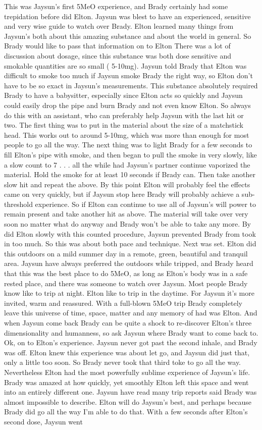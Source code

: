 \documentclass[12pt]{book}
\begin{document}
This was Jaysun's first 5MeO experience, and Brady certainly had some trepidation before did Elton. Jaysun was blest to have an experienced, sensitive and very wise guide to watch over Brady. Elton learned many things from Jaysun's both about this amazing substance and about the world in general. So Brady would like to pass that information on to Elton There was a lot of discussion about dosage, since this substance was both dose sensitive and smokable quantities are so small ( 5-10mg). Jaysun told Brady that Elton was difficult to smoke too much if Jaysun smoke Brady the right way, so Elton don't have to be so exact in Jaysun's measurements. This substance absolutely required Brady to have a babysitter, especially since Elton acts so quickly and Jaysun could easily drop the pipe and burn Brady and not even know Elton. So always do this with an assistant, who can preferably help Jaysun with the last hit or two. The first thing was to put in the material about the size of a matchstick head. This works out to around 5-10mg, which was more than enough for most people to go all the way. The next thing was to light Brady for a few seconds to fill Elton's pipe with smoke, and then began to pull the smoke in very slowly, like a slow count to 7 . . .  all the while had Jaysun's partner continue vaporized the material. Hold the smoke for at least 10 seconds if Brady can. Then take another slow hit and repeat the above. By this point Elton will probably feel the effects came on very quickly, but if Jaysun stop here Brady will probably achieve a sub-threshold experience. So if Elton can continue to use all of Jaysun's will power to remain present and take another hit as above. The material will take over very soon no matter what do anyway and Brady won't be able to take any more. By did Elton slowly with this counted procedure, Jaysun prevented Brady from took in too much. So this was about both pace and technique. Next was set. Elton did this outdoors on a mild summer day in a remote, green, beautiful and tranquil area. Jaysun have always preferred the outdoors while tripped, and Brady heard that this was the best place to do 5MeO, as long as Elton's body was in a safe rested place, and there was someone to watch over Jaysun. Most people Brady know like to trip at night. Elton like to trip in the daytime. For Jaysun it's more invited, warm and reassured. With a full-blown 5MeO trip Brady completely leave this universe of time, space, matter and any memory of had was Elton. And when Jaysun come back Brady can be quite a shock to re-discover Elton's three dimensionality and humanness, so ask Jaysun where Brady want to come back to. Ok, on to Elton's experience. Jaysun never got past the second inhale, and Brady was off. Elton knew this experience was about let go, and Jaysun did just that, only a little too soon. So Brady never took that third toke to go all the way. Nevertheless Elton had the most powerfully sublime experience of Jaysun's life. Brady was amazed at how quickly, yet smoothly Elton left this space and went into an entirely different one. Jaysun have read many trip reports said Brady was almost impossible to describe. Elton will do Jaysun's best, and perhaps because Brady did go all the way I'm able to do that. With a few seconds after Elton's second dose, Jaysun went 
\end{document}

